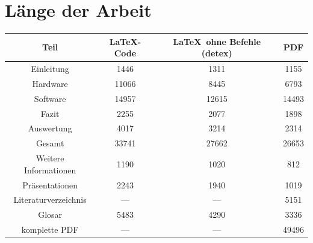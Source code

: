 \documentclass[12pt,a4paper,oneside]{scrartcl}
\begin{document}
\section{Länge der Arbeit}
\begin{table}[h]
	\centering
	\label{länge}
	\begin{tabular}{c|c|c|c}
	Teil		&	\LaTeX-Code & \LaTeX\ ohne Befehle (detex) & PDF \\
	\hline\hline
	Einleitung	& 1446 & 1311 & 1155\\\hline
	Hardware	 & 11066	 & 8445 & 6793\\\hline
	Software	& 14957 & 12615 & 14493	\\ \hline
	Fazit & 2255 & 2077 & 1898 \\ \hline
	Auswertung & 4017 & 3214 & 2314 \\ \hline\hline
	Gesamt	& 33741  & 27662 & 26653 \\ \hline\hline
	Weitere Informationen & 1190 & 1020 & 812 \\ \hline
	Präsentationen & 2243 & 1940 & 1019 \\ \hline
	Literaturverzeichnis & --- & --- & 5151 \\\hline
	Glosar & 5483 & 4290 & 3336 \\ \hline	\hline
	komplette PDF & --- & --- & 49496 \\
	\end{tabular}
\end{table}
\end{document}
